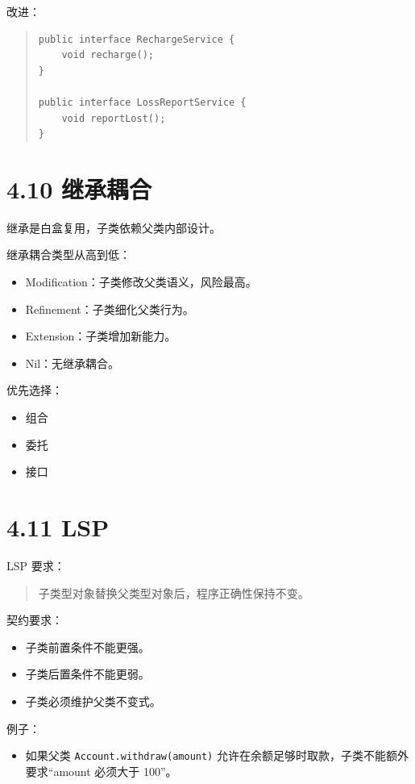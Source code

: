 \documentclass[UTF8,zihao=-4]{ctexart}
\begin{document}
改进：

\begin{quote}
\footnotesize
\begin{verbatim}
public interface RechargeService {
    void recharge();
}

public interface LossReportService {
    void reportLost();
}
\end{verbatim}
\end{quote}

\section{4.10 继承耦合}

继承是白盒复用，子类依赖父类内部设计。

继承耦合类型从高到低：

\begin{itemize}
\item Modification：子类修改父类语义，风险最高。
\item Refinement：子类细化父类行为。
\item Extension：子类增加新能力。
\item Nil：无继承耦合。
\end{itemize}

优先选择：

\begin{itemize}
\item 组合
\item 委托
\item 接口
\end{itemize}

\section{4.11 LSP}

LSP 要求：

\begin{quote}
子类型对象替换父类型对象后，程序正确性保持不变。
\end{quote}

契约要求：

\begin{itemize}
\item 子类前置条件不能更强。
\item 子类后置条件不能更弱。
\item 子类必须维护父类不变式。
\end{itemize}

例子：

\begin{itemize}
\item 如果父类 \texttt{Account.withdraw(amount)} 允许在余额足够时取款，子类不能额外要求“amount 必须大于 100”。
\end{itemize}
\end{document}
